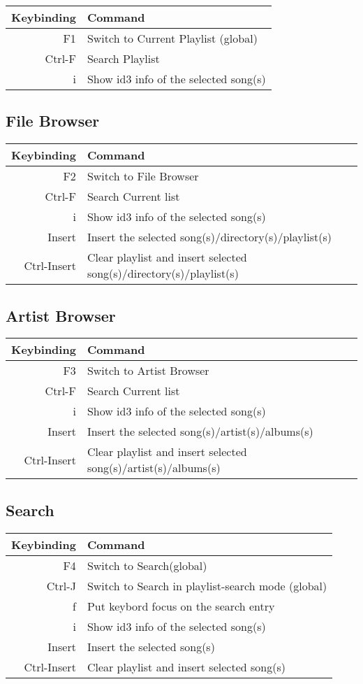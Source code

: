 \documentclass{article}
\begin{document}
\begin{tabular}{r|l}
Keybinding&Command\\
\hline 
F1&Switch to Current Playlist (global)\\
Ctrl-F&Search Playlist\\
i&Show id3 info of the selected song(s)\\
\end{tabular}

\subsection{File Browser}

\begin{tabular}{r|l}
Keybinding&Command\\
\hline 
F2&Switch to File Browser\\
Ctrl-F&Search Current list\\
i&Show id3 info of the selected song(s)\\
Insert&Insert the selected song(s)/directory(s)/playlist(s)\\
Ctrl-Insert&Clear playlist and insert selected song(s)/directory(s)/playlist(s)\\
\end{tabular}

\subsection{Artist Browser}

\begin{tabular}{r|l}
Keybinding&Command\\
\hline 
F3&Switch to Artist Browser\\
Ctrl-F&Search Current list\\
i&Show id3 info of the selected song(s)\\
Insert&Insert the selected song(s)/artist(s)/albums(s)\\
Ctrl-Insert&Clear playlist and insert selected song(s)/artist(s)/albums(s)\\
\end{tabular}

\subsection{Search}

\begin{tabular}{r|l}
Keybinding&Command\\
\hline 
F4&Switch to Search(global)\\
Ctrl-J&Switch to Search in playlist-search mode (global)\\
f&Put keybord focus on the search entry\\
i&Show id3 info of the selected song(s)\\
Insert&Insert the selected song(s)\\                     
Ctrl-Insert&Clear playlist and insert selected song(s)\\
\end{tabular}
\end{document}
